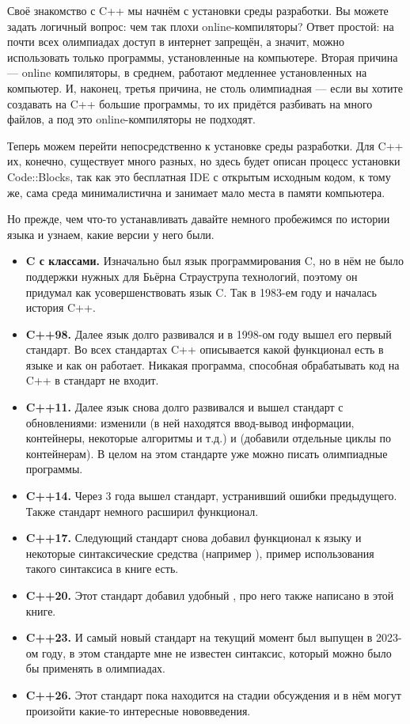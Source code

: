 Своё знакомство с C++ мы начнём с установки среды разработки. Вы можете задать логичный вопрос: чем так плохи online-компиляторы? Ответ простой: на почти всех олимпиадах доступ в интернет запрещён, а значит, можно использовать только программы, установленные на компьютере. Вторая причина — online компиляторы, в среднем, работают медленнее установленных на компьютер. И, наконец, третья причина, не столь олимпиадная — если вы хотите создавать на C++ большие программы, то их придётся разбивать на много файлов, а под это online-компиляторы не подходят.

Теперь можем перейти непосредственно к установке среды разработки. Для C++ их, конечно, существует много разных, но здесь будет описан процесс установки Code::Blocks, так как это бесплатная IDE с открытым исходным кодом, к тому же, сама среда минималистична и занимает мало места в памяти компьютера.

Но прежде, чем что-то устанавливать давайте немного пробежимся по истории языка и узнаем, какие версии у него были. 

\begin{itemize}
    \item \textbf{C с классами.} Изначально был язык программирования C, но в нём не было поддержки нужных для Бьёрна Страуструпа технологий, поэтому он придумал как усовершенствовать язык C. Так в 1983-ем году и началась история C++.
    \item \textbf{C++98.} Далее язык долго развивался и в 1998-ом году вышел его первый стандарт. Во всех стандартах C++ описывается какой функционал есть в языке и как он работает. Никакая программа, способная обрабатывать код на C++ в стандарт не входит.
    \item \textbf{C++11.} Далее язык снова долго развивался и вышел стандарт с обновлениями: изменили  (в ней находятся ввод-вывод информации, контейнеры, некоторые алгоритмы и т.д.) и  (добавили отдельные циклы по контейнерам). В целом на этом стандарте уже можно писать олимпиадные программы.
    \item \textbf{C++14.} Через 3 года вышел стандарт, устранивший ошибки предыдущего. Также стандарт немного расширил функционал.
    \item \textbf{C++17.} Следующий стандарт снова добавил функционал к языку и некоторые синтаксические средства (например ), пример использования такого синтаксиса в книге есть.
    \item \textbf{C++20.} Этот стандарт добавил удобный , про него также написано в этой книге.
    \item \textbf{C++23.} И самый новый стандарт на текущий момент был выпущен в 2023-ом году, в этом стандарте мне не известен синтаксис, который можно было бы применять в олимпиадах.
    \item \textbf{C++26.} Этот стандарт пока находится на стадии обсуждения и в нём могут произойти какие-то интересные нововведения.
\end{itemize}

